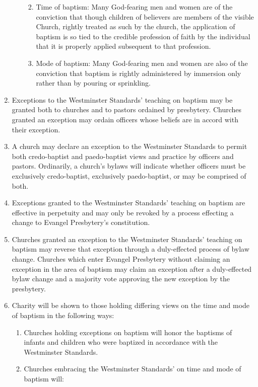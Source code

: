 \documentclass[
]{book}
\providecommand{\tightlist}{%
  \setlength{\itemsep}{0pt}\setlength{\parskip}{0pt}}
\begin{document}
\begin{enumerate}
\begin{enumerate}
    \begin{enumerate}
    \def\labelenumiii{\arabic{enumiii}.}
    \tightlist
    \item
      Time of baptism: Many God-fearing men and women are of the conviction that though children of believers are members of the visible Church, rightly treated as such by the church, the application of baptism is so tied to the credible profession of faith by the individual that it is properly applied subsequent to that profession.
    \item
      Mode of baptism: Many God-fearing men and women are also of the conviction that baptism is rightly administered by immersion only rather than by pouring or sprinkling.
    \end{enumerate}
  \end{enumerate}
\item
  Exceptions to the Westminster Standards' teaching on baptism may be granted both to churches and to pastors ordained by presbytery. Churches granted an exception may ordain officers whose beliefs are in accord with their exception.
\item
  A church may declare an exception to the Westminster Standards to permit both credo-baptist and paedo-baptist views and practice by officers and pastors. Ordinarily, a church's bylaws will indicate whether officers must be exclusively credo-baptist, exclusively paedo-baptist, or may be comprised of both.
\item
  Exceptions granted to the Westminster Standards' teaching on baptism are effective in perpetuity and may only be revoked by a process effecting a change to Evangel Presbytery's constitution.
\item
  Churches granted an exception to the Westminster Standards' teaching on baptism may reverse that exception through a duly-effected process of bylaw change. Churches which enter Evangel Presbytery without claiming an exception in the area of baptism may claim an exception after a duly-effected bylaw change and a majority vote approving the new exception by the presbytery.
\item
  Charity will be shown to those holding differing views on the time and mode of baptism in the following ways:

  \begin{enumerate}
  \def\labelenumii{\alph{enumii}.}
  \tightlist
  \item
    Churches holding exceptions on baptism will honor the baptisms of infants and children who were baptized in accordance with the Westminster Standards.
  \item
    Churches embracing the Westminster Standards' on time and mode of baptism will:


\end{enumerate}
\end{enumerate}
\end{document}
